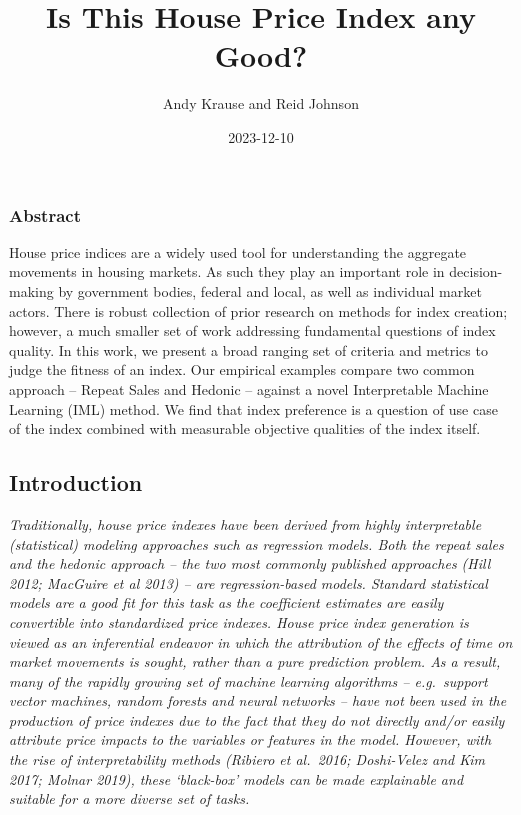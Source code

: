 \documentclass[
]{article}
\title{Is This House Price Index any Good?}
\author{Andy Krause and Reid Johnson}
\date{2023-12-10}
\begin{document}
\maketitle

\hypertarget{abstract}{%
\subsubsection{Abstract}\label{abstract}}

House price indices are a widely used tool for understanding the
aggregate movements in housing markets. As such they play an important
role in decision-making by government bodies, federal and local, as well
as individual market actors. There is robust collection of prior
research on methods for index creation; however, a much smaller set of
work addressing fundamental questions of index quality. In this work, we
present a broad ranging set of criteria and metrics to judge the fitness
of an index. Our empirical examples compare two common approach --
Repeat Sales and Hedonic -- against a novel Interpretable Machine
Learning (IML) method. We find that index preference is a question of
use case of the index combined with measurable objective qualities of
the index itself.

\hypertarget{introduction}{%
\subsection{Introduction}\label{introduction}}

\emph{Traditionally, house price indexes have been derived from highly
interpretable (statistical) modeling approaches such as regression
models. Both the repeat sales and the hedonic approach -- the two most
commonly published approaches (Hill 2012; MacGuire et al 2013) -- are
regression-based models. Standard statistical models are a good fit for
this task as the coefficient estimates are easily convertible into
standardized price indexes. House price index generation is viewed as an
inferential endeavor in which the attribution of the effects of time on
market movements is sought, rather than a pure prediction problem. As a
result, many of the rapidly growing set of machine learning algorithms
-- e.g.~support vector machines, random forests and neural networks --
have not been used in the production of price indexes due to the fact
that they do not directly and/or easily attribute price impacts to the
variables or features in the model. However, with the rise of
interpretability methods (Ribiero et al.~2016; Doshi-Velez and Kim 2017;
Molnar 2019), these `black-box' models can be made explainable and
suitable for a more diverse set of tasks. }
\end{document}
